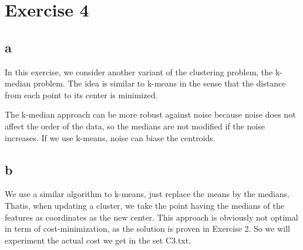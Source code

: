 \section*{Exercise 4}
\subsection*{a}
In this exercise, we consider another variant of the clustering problem, the
k-median problem. The idea is similar to k-means in the sense that the distance
from each point to its center is minimized.

The k-median approach can be more robust against noise because noise does not 
affect the order of the data, so the medians are not modified if the noise 
increases. If we use k-means, noise can biase the centroids. 

\subsection*{b}
We use a similar algorithm to k-means, just replace the means by the medians. Thatis, when updating a cluster, we take the point having the medians of the features as coordinates as the new center. This approach is obviously not optimal in term of cost-minimization, as the solution is proven in Exercise 2. So we will 
experiment the actual cost we get in the set C3.txt.
